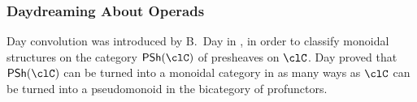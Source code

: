 \documentclass[11pt]{amsart}
\newcommand{\PSh}[1]{\textsf{\upshape PSh}(#1)}
\newcommand{\PShf}{\textsf{\upshape PSh}}
\def\Cat{\mathsf{Cat}}
\begin{document}
\subsubsection{Daydreaming About Operads}
Day convolution was introduced by B.\ Day in \cite{day:thesis,day:report}, in order to classify monoidal structures on the category $\PSh{\clC}$ of presheaves on $\clC$. Day proved that $\PSh{\clC}$ can be turned into a monoidal category in as many ways as $\clC$ can be turned into a pseudomonoid in the bicategory of profunctors.%
\end{document}
